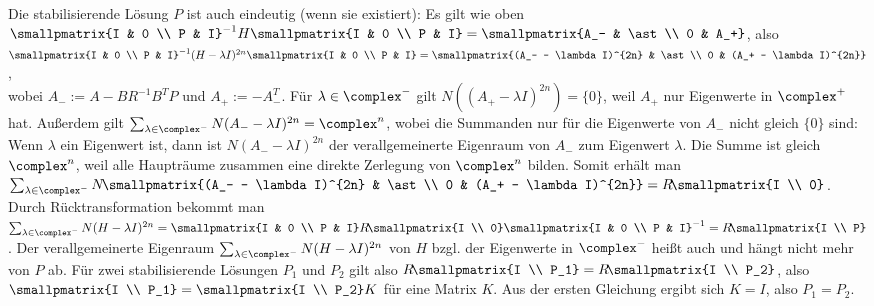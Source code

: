 Die stabilisierende Lösung $P$ ist auch eindeutig (wenn sie existiert):
Es gilt wie oben\\
$\smallpmatrix{I & 0 \\ P & I}^{-1} H \smallpmatrix{I & 0 \\ P & I}
= \smallpmatrix{A_- & \ast \\ 0 & A_+}$,
also $\smallpmatrix{I & 0 \\ P & I}^{-1} (H - \lambda I)^{2n} \smallpmatrix{I & 0 \\ P & I}
= \smallpmatrix{(A_- - \lambda I)^{2n} & \ast \\ 0 & (A_+ - \lambda I)^{2n}}$,\\
wobei $A_- := A - BR^{-1} B^T P$ und $A_+ := -A_-^T$.
Für $\lambda \in \complex^-$ gilt $N((A_+ - \lambda I)^{2n}) = \{0\}$,
weil $A_+$ nur Eigenwerte in $\complex^+$ hat.
Außerdem gilt $\sum_{\lambda \in \complex^-} N(A_- - \lambda I)^{2n} = \complex^n$,
wobei die Summanden nur für die Eigenwerte von $A_-$ nicht gleich $\{0\}$ sind:
Wenn $\lambda$ ein Eigenwert ist, dann ist $N(A_- - \lambda I)^{2n}$ der verallgemeinerte Eigenraum
von $A_-$ zum Eigenwert $\lambda$.
Die Summe ist gleich $\complex^n$, weil alle Haupträume zusammen eine direkte Zerlegung von
$\complex^n$ bilden.
Somit erhält man
$\sum_{\lambda \in \complex^-}
N\!\smallpmatrix{(A_- - \lambda I)^{2n} & \ast \\ 0 & (A_+ - \lambda I)^{2n}} =
R\!\smallpmatrix{I \\ 0}$.
Durch Rücktransformation bekommt man
$\sum_{\lambda \in \complex^-} N(H - \lambda I)^{2n}
= \smallpmatrix{I & 0 \\ P & I} R\!\smallpmatrix{I \\ 0} \smallpmatrix{I & 0 \\ P & I}^{-1}
= R\!\smallpmatrix{I \\ P}$.
Der verallgemeinerte Eigenraum $\sum_{\lambda \in \complex^-} N(H - \lambda I)^{2n}$
von $H$ bzgl. der Eigenwerte in $\complex^-$
heißt auch 
und hängt nicht mehr von $P$ ab.
Für zwei stabilisierende Lösungen $P_1$ und $P_2$ gilt also
$R\!\smallpmatrix{I \\ P_1} = R\!\smallpmatrix{I \\ P_2}$, also
$\smallpmatrix{I \\ P_1} = \smallpmatrix{I \\ P_2} K$ für eine Matrix $K$.
Aus der ersten Gleichung ergibt sich $K = I$, also $P_1 = P_2$.

